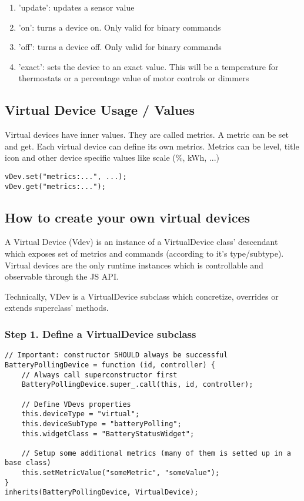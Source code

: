 \begin{enumerate}
\item 'update': updates a sensor value
\item 'on': turns a device on.  Only valid for binary commands
\item 'off': turns a device off. Only valid for binary commands
\item 'exact': sets the device to an exact value. This will be a temperature for 
thermostats or a percentage value of motor controls or dimmers
\end{enumerate}

\subsection{Virtual Device Usage / Values}

Virtual devices have inner values. They are called metrics. A metric can be set and get. 
Each virtual device can define its own metrics. Metrics can be level, title icon and 
other device specific values like scale (\%, kWh, ...)

\begin{lstlisting}[basicstyle=\small]
vDev.set("metrics:...", ...);  
vDev.get("metrics:...");
\end{lstlisting}

\subsection{How to create your own virtual devices}

A Virtual Device (Vdev) is an instance of a VirtualDevice class' descendant which exposes 
set of metrics and commands (according to it's type/subtype). Virtual devices are the only 
runtime instances which is controllable and observable through the JS API.

Technically, VDev is a VirtualDevice subclass which concretize, overrides or extends 
superclass' methods.

\subsubsection{Step 1. Define a VirtualDevice subclass}

\begin{lstlisting}[basicstyle=\small,columns=fullflexible]
// Important: constructor SHOULD always be successful
BatteryPollingDevice = function (id, controller) {
    // Always call superconstructor first
    BatteryPollingDevice.super_.call(this, id, controller);

    // Define VDevs properties
    this.deviceType = "virtual";
    this.deviceSubType = "batteryPolling";
    this.widgetClass = "BatteryStatusWidget";

    // Setup some additional metrics (many of them is setted up in a base class)
    this.setMetricValue("someMetric", "someValue");
}
inherits(BatteryPollingDevice, VirtualDevice);
\end{lstlisting}

